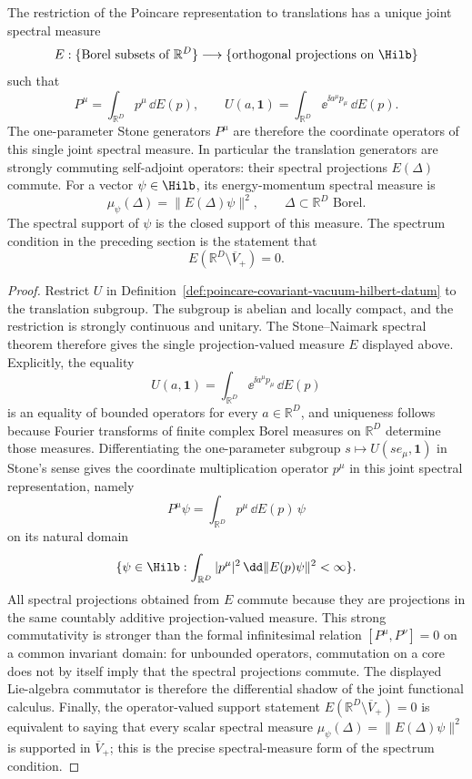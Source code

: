 \begin{proposition}
\label{prop:joint-translation-spectrum}
The restriction of the Poincare representation to translations has a unique
joint spectral measure
\[
  E:\{\text{Borel subsets of }\mathbb R^D\}\longrightarrow
  \{\text{orthogonal projections on }\Hilb\}
\]
such that
\[
  P^\mu=\int_{\mathbb R^D}p^\mu\,\dd E(p),
  \qquad
  U(a,\mathbf 1)
  =
  \int_{\mathbb R^D}\ee^{\ii a^\mu p_\mu}\,\dd E(p).
\]
The one-parameter Stone generators \(P^\mu\) are therefore the coordinate
operators of this single joint spectral measure.  In particular the
translation generators are strongly commuting self-adjoint operators: their
spectral projections \(E(\Delta)\) commute.
For a vector \(\psi\in\Hilb\), its energy-momentum spectral measure is
\[
  \mu_\psi(\Delta)=\|E(\Delta)\psi\|^2 ,
  \qquad
  \Delta\subset\mathbb R^D\text{ Borel}.
\]
The spectral support of \(\psi\) is the closed support of this measure.  The
spectrum condition in the preceding section is the statement that
\[
  E(\mathbb R^D\setminus\overline V_+)=0 .
\]
\end{proposition}

\begin{proof}
Restrict \(U\) in
Definition~\ref{def:poincare-covariant-vacuum-hilbert-datum} to the
translation subgroup.  The subgroup is abelian and locally compact, and the
restriction is strongly continuous and unitary.  The Stone--Naimark spectral
theorem therefore gives the single projection-valued measure \(E\) displayed
above.  Explicitly, the equality
\[
  U(a,\mathbf 1)
  =
  \int_{\mathbb R^D}\ee^{\ii a^\mu p_\mu}\,\dd E(p)
\]
is an equality of bounded operators for every \(a\in\mathbb R^D\), and
uniqueness follows because Fourier transforms of finite complex Borel
measures on \(\mathbb R^D\) determine those measures.  Differentiating the
one-parameter subgroup \(s\mapsto U(se_\mu,\mathbf1)\) in Stone's sense gives
the coordinate multiplication operator \(p^\mu\) in this joint spectral
representation, namely
\[
  P^\mu\psi=\int_{\mathbb R^D}p^\mu\,\dd E(p)\,\psi
\]
on its natural domain
\[
  \{\psi\in\Hilb:\int_{\mathbb R^D}|p^\mu|^2\,\dd\|E(p)\psi\|^2<\infty\}.
\]
All spectral projections obtained from \(E\) commute because they are
projections in the same countably additive projection-valued measure.  This
strong commutativity is stronger than the formal infinitesimal relation
\([P^\mu,P^\nu]=0\) on a common invariant domain: for unbounded operators,
commutation on a core does not by itself imply that the spectral projections
commute.  The displayed Lie-algebra commutator is therefore the differential
shadow of the joint functional calculus.  Finally, the operator-valued
support statement
\(E(\mathbb R^D\setminus\overline V_+)=0\) is equivalent to saying that every
scalar spectral measure \(\mu_\psi(\Delta)=\|E(\Delta)\psi\|^2\) is supported
in \(\overline V_+\); this is the precise spectral-measure form of the
spectrum condition.
\end{proof}

